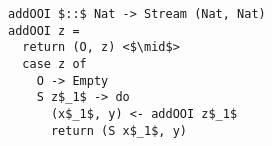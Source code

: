 \begin{figure}[!t]
  \centering
  \begin{minipage}{0.9\columnwidth}
    \begin{lstlisting}[frame=tb,language=ocanren1]
addOOI $::$ Nat -> Stream (Nat, Nat)
addOOI z =
  return (O, z) <$\mid$>
  case z of
    O -> Empty
    S z$_1$ -> do
      (x$_1$, y) <- addOOI z$_1$
      return (S x$_1$, y)
    \end{lstlisting}
  \end{minipage}
\end{figure}
